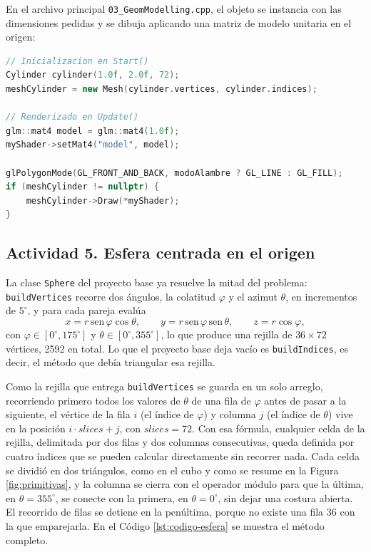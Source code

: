 En el archivo principal \texttt{03\_GeomModelling.cpp}, el objeto se instancia con las dimensiones pedidas y se dibuja aplicando una matriz de modelo unitaria en el origen:

\begin{lstlisting}[language=C++, caption={Instanciación y dibujado del cilindro en 03\_GeomModelling.cpp.}]
// Inicializacion en Start()
Cylinder cylinder(1.0f, 2.0f, 72);
meshCylinder = new Mesh(cylinder.vertices, cylinder.indices);

// Renderizado en Update()
glm::mat4 model = glm::mat4(1.0f);
myShader->setMat4("model", model);

glPolygonMode(GL_FRONT_AND_BACK, modoAlambre ? GL_LINE : GL_FILL);
if (meshCylinder != nullptr) {
    meshCylinder->Draw(*myShader);
}
\end{lstlisting}

\subsection{Actividad 5. Esfera centrada en el origen}
La clase \texttt{Sphere} del proyecto base ya resuelve la mitad del problema:
\texttt{buildVertices} recorre dos ángulos, la colatitud $\varphi$ y el
azimut $\theta$, en incrementos de $5^\circ$, y para cada pareja evalúa
\[
    x = r\,\mathrm{sen}\,\varphi\cos\theta, \qquad
    y = r\,\mathrm{sen}\,\varphi\,\mathrm{sen}\,\theta, \qquad
    z = r\cos\varphi,
\]
con $\varphi \in [0^\circ, 175^\circ]$ y $\theta \in [0^\circ, 355^\circ]$, lo
que produce una rejilla de $36 \times 72$ vértices, 2592 en total. Lo que el
proyecto base deja vacío es \texttt{buildIndices}, es decir, el método que
debía triangular esa rejilla.

Como la rejilla que entrega \texttt{buildVertices} se guarda en un solo
arreglo, recorriendo primero todos los valores de $\theta$ de una fila de
$\varphi$ antes de pasar a la siguiente, el vértice de la fila $i$
(el índice de $\varphi$) y columna $j$ (el índice de $\theta$) vive en la
posición $i \cdot \mathit{slices} + j$, con $\mathit{slices}=72$. Con esa
fórmula, cualquier celda de la rejilla, delimitada por dos filas y dos
columnas consecutivas, queda definida por cuatro índices que se pueden
calcular directamente sin recorrer nada. Cada celda se dividió en dos
triángulos, como en el cubo y como se resume en la Figura
\ref{fig:primitivas}, y la columna se cierra con el operador módulo para que
la última, en $\theta=355^\circ$, se conecte con la primera, en
$\theta=0^\circ$, sin dejar una costura abierta. El recorrido de filas se
detiene en la penúltima, porque no existe una fila 36 con la que emparejarla.
En el Código \ref{lst:codigo-esfera} se muestra el método completo.

